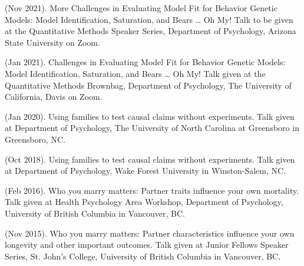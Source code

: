 %
\item\meb (Nov 2021). More Challenges in Evaluating Model Fit for Behavior Genetic Models: Model Identification, Saturation, and Bears … Oh My! Talk to be given at the Quantitative Methods Speaker Series, Department of Psychology, Arizona State University on Zoom.
%
\item\meb (Jan 2021). Challenges in Evaluating Model Fit for Behavior Genetic Models: Model Identification, Saturation, and Bears … Oh My! Talk given at the Quantitative Methods Brownbag, Department of Psychology, The University of California, Davis on Zoom.
%
\item\meb (Jan 2020). Using families to test causal claims without experiments. Talk given at Department of Psychology, The University of North Carolina at Greensboro in Greensboro, NC.
%
%
%
\item\meb (Oct 2018). Using families to test causal claims without experiments. Talk given at Department of Psychology, Wake Forest University in Winston-Salem, NC.
%
\item \meb (Feb 2016). Who you marry matters: Partner traits influence your own mortality. Talk given at Health Psychology Area Workshop, Department of Psychology, University of British Columbia in Vancouver, BC. 
%
\item \meb (Nov 2015). Who you marry matters: Partner characteristics influence your own longevity and other important outcomes. Talk given at Junior Fellows Speaker Series, St. John's College, University of British Columbia in Vancouver, BC. \smallskip

